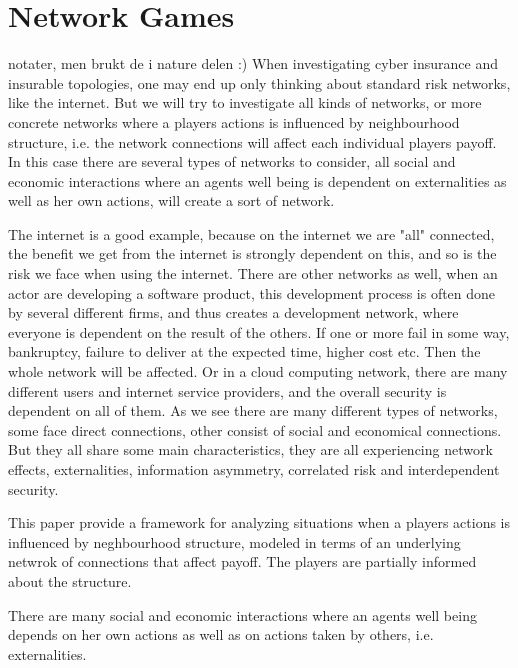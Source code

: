 \chapter{Network Games}
\label{chp:networkgames} 


notater, men brukt de i nature delen :)
When investigating cyber insurance and insurable topologies, one may end up only thinking about standard risk networks, like the internet. 
But we will try to investigate all kinds of networks, or more concrete networks where a players actions is influenced by neighbourhood structure, i.e. the network connections will affect each individual players payoff. 
In this case there are several types of networks to consider, all social and economic interactions where an agents well being is dependent on externalities as well as her own actions, will create a sort of network.

The internet is a good example, because on the internet we are "all" connected, the benefit we get from the internet is strongly dependent on this, and so is the risk we face when using the internet. 
There are other networks as well, when an actor are developing a software product, this development process is often done by several different firms, and thus creates a development network, where everyone is dependent on the result of the others. 
If one or more fail in some way, bankruptcy, failure to deliver at the expected time, higher cost etc. 
Then the whole network will be affected. 
Or in a cloud computing network, there are many different users and internet service providers, and the overall security is dependent on all of them. 
As we see there are many different types of networks, some face direct connections, other consist of social and economical connections. But they all share some main characteristics, they are all experiencing network effects, externalities, information asymmetry, correlated risk and interdependent security. \cite{networkgames}


This paper\cite{networkgames}  provide a framework for analyzing situations when a players actions is influenced by neghbourhood structure, modeled in terms of an underlying netwrok of connections that affect payoff.
The players are partially informed about the structure. 

There are many social and economic interactions where an agents well being depends on her own actions as well as on actions taken by others, i.e. externalities. 


